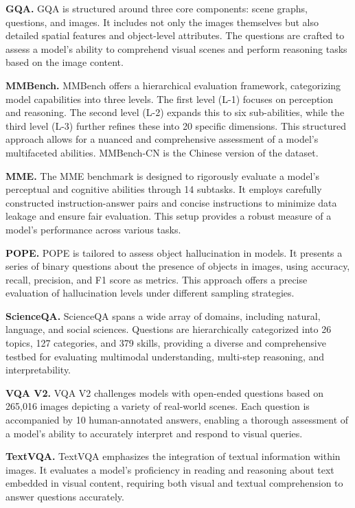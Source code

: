\textbf{GQA.} GQA is structured around three core components: scene graphs, questions, and images. It includes not only the images themselves but also detailed spatial features and object-level attributes. The questions are crafted to assess a model's ability to comprehend visual scenes and perform reasoning tasks based on the image content.

\textbf{MMBench.} MMBench offers a hierarchical evaluation framework, categorizing model capabilities into three levels. The first level (L-1) focuses on perception and reasoning. The second level (L-2) expands this to six sub-abilities, while the third level (L-3) further refines these into 20 specific dimensions. This structured approach allows for a nuanced and comprehensive assessment of a model's multifaceted abilities. MMBench-CN is the Chinese version of the dataset.

\textbf{MME.} The MME benchmark is designed to rigorously evaluate a model's perceptual and cognitive abilities through 14 subtasks. It employs carefully constructed instruction-answer pairs and concise instructions to minimize data leakage and ensure fair evaluation. This setup provides a robust measure of a model's performance across various tasks.

\textbf{POPE.} POPE is tailored to assess object hallucination in models. It presents a series of binary questions about the presence of objects in images, using accuracy, recall, precision, and F1 score as metrics. This approach offers a precise evaluation of hallucination levels under different sampling strategies.

\textbf{ScienceQA.} ScienceQA spans a wide array of domains, including natural, language, and social sciences. Questions are hierarchically categorized into 26 topics, 127 categories, and 379 skills, providing a diverse and comprehensive testbed for evaluating multimodal understanding, multi-step reasoning, and interpretability.

\textbf{VQA V2.} VQA V2 challenges models with open-ended questions based on 265,016 images depicting a variety of real-world scenes. Each question is accompanied by 10 human-annotated answers, enabling a thorough assessment of a model's ability to accurately interpret and respond to visual queries.

\textbf{TextVQA.} TextVQA emphasizes the integration of textual information within images. It evaluates a model's proficiency in reading and reasoning about text embedded in visual content, requiring both visual and textual comprehension to answer questions accurately.

